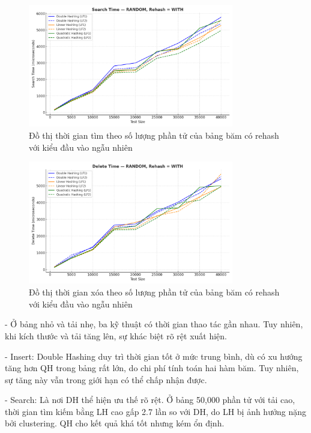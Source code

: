 \documentclass[12pt,a4paper]{report}
\begin{document}
\begin{figure}[!ht]
    \centering
    \includegraphics[width=0.8\textwidth]{ran_search_hash.png}
    \caption{Đồ thị thời gian tìm theo số lượng phần tử của bảng băm có rehash với kiểu đầu vào ngẫu nhiên}
    \label{fig:flowchart}
\end{figure}

\begin{figure}[!ht]
    \centering
    \includegraphics[width=0.8\textwidth]{ran_del_hash.png}
    \caption{Đồ thị thời gian xóa theo số lượng phần tử của bảng băm có rehash với kiểu đầu vào ngẫu nhiên}
    \label{fig:flowchart}
\end{figure}
\noindent \indent-	Ở bảng nhỏ và tải nhẹ, ba kỹ thuật có thời gian thao tác gần nhau. Tuy nhiên, khi kích thước và tải tăng lên, sự khác biệt rõ rệt xuất hiện.

-	Insert: Double Hashing duy trì thời gian tốt ở mức trung bình, dù có xu hướng tăng hơn QH trong bảng rất lớn, do chi phí tính toán hai hàm băm. Tuy nhiên, sự tăng này vẫn trong giới hạn có thể chấp nhận được.

-	Search: Là nơi DH thể hiện ưu thế rõ rệt. Ở bảng 50,000 phần tử với tải cao, thời gian tìm kiếm bằng LH cao gấp 2.7 lần so với DH, do LH bị ảnh hưởng nặng bởi clustering. QH cho kết quả khá tốt nhưng kém ổn định.
\end{document}
